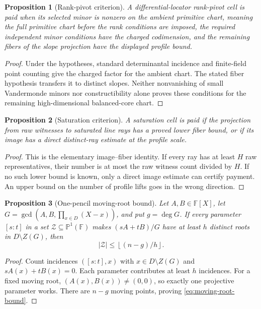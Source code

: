 \documentclass[12pt,a4paper]{amsart}
\numberwithin{equation}{section}
\newtheorem{proposition}[proposition]{Proposition}
\theoremstyle{remark}
\newcommand{\F}{\mathbb F}
\newcommand{\abs}[1]{\lvert #1\rvert}
\newcommand{\floor}[1]{\left\lfloor #1\right\rfloor}
\begin{document}
\begin{proposition}[Rank-pivot criterion]\label{prop:rank-pivot-payment}
A differential-locator rank-pivot cell is paid when its selected
minor is nonzero on the \emph{ambient primitive chart}, meaning the full
primitive chart before the rank conditions are imposed, the required independent
minor conditions have the charged codimension, and the remaining fibers of
the slope projection have the displayed profile bound.
\end{proposition}

\begin{proof}
Under the hypotheses, standard determinantal incidence and finite-field
point counting give the charged factor for the ambient chart.  The stated
fiber hypothesis transfers it to distinct slopes.  Neither nonvanishing of
small Vandermonde minors nor constructibility alone proves these conditions
for the remaining high-dimensional balanced-core chart.
\end{proof}

\begin{proposition}[Saturation criterion]\label{prop:saturation-payment}
A saturation cell is paid if the projection from raw witnesses to saturated
line rays has a proved lower fiber bound, or if its image has a direct
distinct-ray estimate at the profile scale.
\end{proposition}

\begin{proof}
This is the elementary image--fiber identity.  If every ray has at least
\(H\) raw representatives, their number is at most the raw witness count
divided by \(H\).  If no such lower bound is known, only a direct image
estimate can certify payment.  An upper bound on the number of profile lifts
goes in the wrong direction.
\end{proof}

\begin{proposition}[One-pencil moving-root bound]
\label{prop:split-pencil-payment}
Let \(A,B\in\F[X]\), let
\(G=\gcd(A,B,\prod_{x\in D}(X-x))\), and put \(g=\deg G\).  If every
parameter \([s:t]\) in a set \(\mathcal Z\subseteq\mathbb P^1(\F)\)
makes \((sA+tB)/G\) have at least \(h\) distinct roots in
\(D\setminus Z(G)\), then
\[
        \abs{\mathcal Z}\le\floor{(n-g)/h}.
        \tag{7.1}\label{eq:moving-root-bound}
\]
\end{proposition}

\begin{proof}
Count incidences \(([s:t],x)\) with \(x\in D\setminus Z(G)\) and
\(sA(x)+tB(x)=0\).  Each parameter contributes at least \(h\) incidences.
For a fixed moving root, \((A(x),B(x))\ne(0,0)\), so exactly one projective
parameter works.  There are \(n-g\) moving points, proving
\eqref{eq:moving-root-bound}.
\end{proof}
\end{document}
